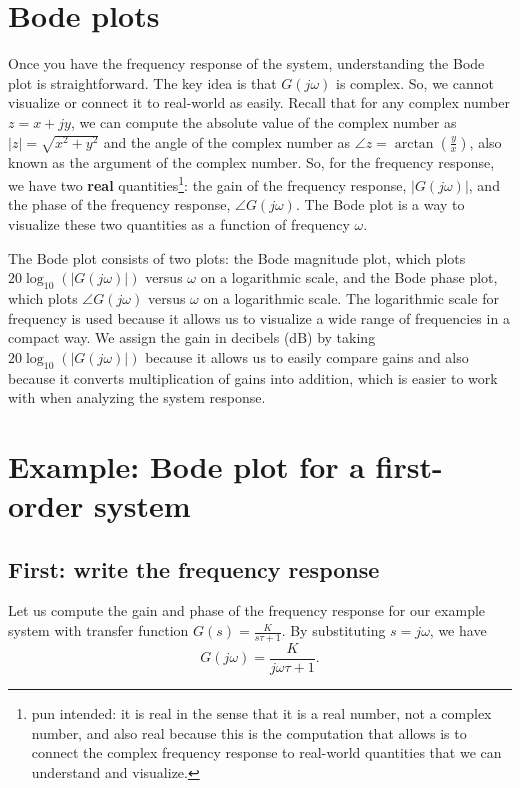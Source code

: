 \documentclass{ee122_notes}
\begin{document}
\section{Bode plots}
Once you have the frequency response of the system, understanding the Bode plot is straightforward. The key idea is that $G(j\omega)$ is complex. So, we cannot visualize or connect it to real-world as easily. Recall that for any complex number \(z = x + jy\), we can compute the absolute value of the complex number as \(|z| = \sqrt{x^2 + y^2}\) and the angle of the complex number as \(\angle z = \arctan\left(\frac{y}{x}\right)\), also known as the argument of the complex number. So, for the frequency response, we have two \textbf{real} quantities\footnote{pun intended: it is real in the sense that it is a real number, not a complex number, and also real because this is the computation that allows is to connect the complex frequency response to real-world quantities that we can understand and visualize.}: the gain of the frequency response, $|G(j\omega)|$, and the phase of the frequency response, \(\angle G(j\omega)\). The Bode plot is a way to visualize these two quantities as a function of frequency $\omega$.

The Bode plot consists of two plots: the Bode magnitude plot, which plots \(20\log_{10}(|G(j\omega)|)\) versus \(\omega\) on a logarithmic scale, and the Bode phase plot, which plots \(\angle G(j\omega)\) versus \(\omega\) on a logarithmic scale. The logarithmic scale for frequency is used because it allows us to visualize a wide range of frequencies in a compact way. We assign the gain in decibels (dB) by taking \(20\log_{10}(|G(j\omega)|)\) because it allows us to easily compare gains and also because it converts multiplication of gains into addition, which is easier to work with when analyzing the system response. 

\section{Example: Bode plot for a first-order system}
\subsection{First: write the frequency response}
Let us compute the gain and phase of the frequency response for our example system with transfer function \(G(s) = \frac{K}{s\tau + 1}\). By substituting \(s = j\omega\), we have
\[
G(j\omega) = \frac{K}{j\omega\tau + 1}.
\]
\end{document}
